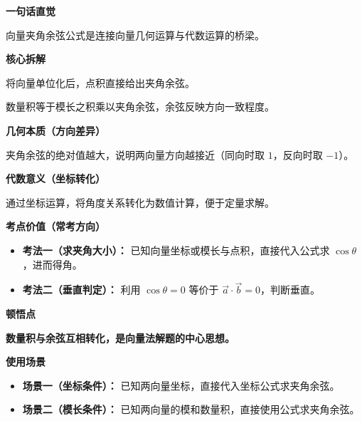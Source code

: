 \begin{explanationbox}
	\textbf{\textcolor{CExplanation}{一句话直觉}}

	向量夹角余弦公式是连接向量几何运算与代数运算的桥梁。

	\medskip
	\textbf{\textcolor{CExplanation}{核心拆解}}
	\begin{description}[style=nextline, leftmargin=2.8em, labelsep=0.5em, itemsep=0.45em]
		\item[\textbf{要点一（单位向量）：}] 将向量单位化后，点积直接给出夹角余弦。
		\item[\textbf{要点二（投影关系）：}] 数量积等于模长之积乘以夹角余弦，余弦反映方向一致程度。
	\end{description}

	\medskip
	\textbf{\textcolor{CExplanation}{几何本质（方向差异）}}

	夹角余弦的绝对值越大，说明两向量方向越接近（同向时取 $1$，反向时取 $-1$）。

	\medskip
	\textbf{\textcolor{CExplanation}{代数意义（坐标转化）}}

	通过坐标运算，将角度关系转化为数值计算，便于定量求解。

	\medskip
	\textbf{\textcolor{CExplanation}{考点价值（常考方向）}}
	\begin{itemize}[leftmargin=*, itemsep=0.5em, topsep=0.4em]
		\item \textbf{考法一（求夹角大小）：} 已知向量坐标或模长与点积，直接代入公式求 $\cos\theta$，进而得角。
		\item \textbf{考法二（垂直判定）：} 利用 $\cos\theta=0$ 等价于 $\vec{a}\cdot\vec{b}=0$，判断垂直。
	\end{itemize}

	\medskip
	\textbf{\textcolor{CExplanation}{顿悟点}}

	\textbf{数量积与余弦互相转化，是向量法解题的中心思想。}

	\medskip
	\textbf{\textcolor{CExplanation}{使用场景}}
	\begin{itemize}[leftmargin=*, itemsep=0.5em, topsep=0.4em]
		\item \textbf{场景一（坐标条件）：} 已知两向量坐标，直接代入坐标公式求夹角余弦。
		\item \textbf{场景二（模长条件）：} 已知两向量的模和数量积，直接使用公式求夹角余弦。
	\end{itemize}
\end{explanationbox}
